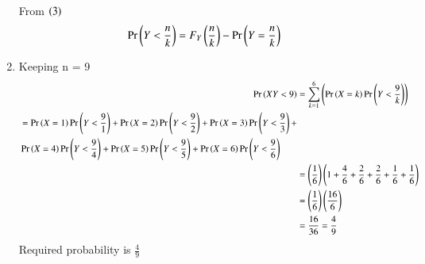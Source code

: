 \documentclass[journal,12pt,onecolumn]{IEEEtran}
\begin{document}
\begin{enumerate}[label=(\alph*)]
\begin{align}
                         \end{align}
                        From $\left(3\right)$
			\begin{align}
			\Pr\left(Y < \frac{n}{k}\right) &= F_Y\left(\frac{n}{k}\right) - \Pr\left(Y = \frac{n}{k}\right)
                                \end{align}
		 \item Keeping n = 9
			 \begin{align}
			  \Pr\left(XY < 9\right) &= \sum_{k=1}^{6}\left(\Pr\left(X=k\right)\Pr\left(Y < \frac{9}{k}\right)\right) \\
				 \begin{split} &= \Pr\left(X=1\right)\Pr\left(Y < \frac{9}{1}\right) +\Pr\left(X=2\right)\Pr\left(Y < \frac{9}{2}\right) +\Pr\left(X=3\right)\Pr\left(Y < \frac{9}{3}\right) + \\ 
					 & \Pr\left(X=4\right)\Pr\left(Y < \frac{9}{4}\right) +\Pr\left(X=5\right)\Pr\left(Y < \frac{9}{5}\right) +\Pr\left(X=6\right)\Pr\left(Y < \frac{9}{6}\right) \\
				 \end{split} \\
			  &= \left(\frac{1}{6}\right)\left(1 + \frac{4}{6} + \frac{2}{6} + \frac{2}{6} + \frac{1}{6} +\frac{1}{6}\right) \\
			  &= \left(\frac{1}{6}\right)\left(\frac{16}{6}\right) \\
			  &= \frac{16}{36}= \frac{4}{9}
			 \end{align}
        Required probability is $\frac{4}{9}$
 \end{enumerate} 
 
\end{document}
